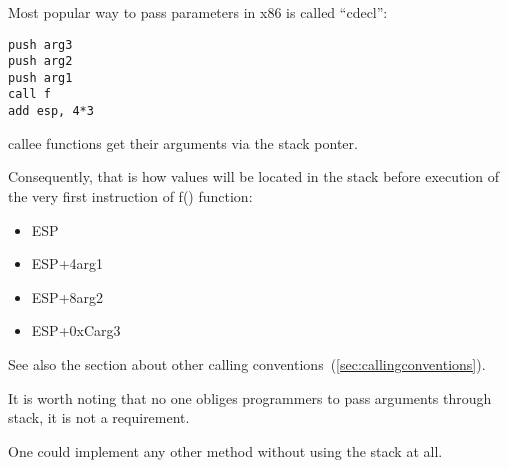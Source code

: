 \subsubsection{}

{Most popular way to pass parameters in x86 is called} ``cdecl'':

\begin{lstlisting}
push arg3
push arg2
push arg1
call f
add esp, 4*3
\end{lstlisting}

{\Gls{callee} functions get their arguments via the stack ponter.}

{Consequently, that is how values will be located in the stack before execution
of the very first instruction of f() function:}

\begin{itemize}
\item ESP\EMDASH{}
\item ESP+4\EMDASH{}arg1
\item ESP+8\EMDASH{}arg2
\item ESP+0xC\EMDASH{}arg3
\end{itemize}

{See also the section about other calling conventions}~(\ref{sec:callingconventions}).

{It is worth noting that no one obliges programmers to pass arguments through stack, it is not a requirement.}

{One could implement any other method without using the stack at all.}

